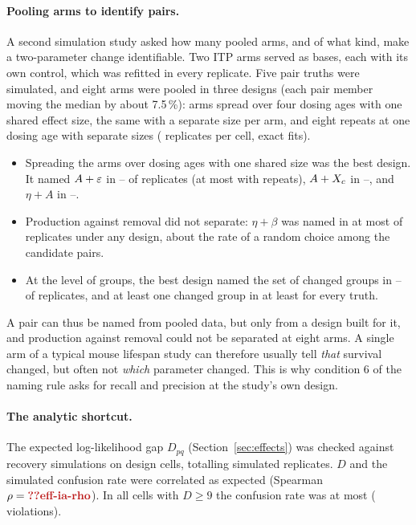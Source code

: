 \paragraph{Pooling arms to identify pairs.} A second simulation study asked how many pooled arms, and of what kind, make
a two-parameter change identifiable. Two ITP arms served as bases, each with its own control, which was refitted in
every replicate. Five pair truths were simulated, and eight arms were pooled
in three designs (each pair member moving the median by about 7.5\,\%): arms spread over four dosing ages with one shared effect size, the same with a separate size per arm,
and eight repeats at one dosing age with separate sizes ( replicates per cell, exact fits).
\begin{itemize}[leftmargin=1.5em,itemsep=1pt]
  \item Spreading the arms over dosing ages with one shared size was the best design. It named $A+\varepsilon$ in
    -- of replicates (at most  with repeats), $A+X_c$ in
    --, and $\eta+A$ in --.
  \item Production against removal did not separate: $\eta+\beta$ was named in at most  of
    replicates under any design, about the rate of a random choice among the candidate pairs.
  \item At the level of groups, the best design named the set of changed groups in --
    of replicates, and at least one changed group in at least  for every truth.
\end{itemize}
A pair can thus be named from pooled data, but only from a design built for it, and production against removal could
not be separated at eight arms.
A single arm of a typical mouse lifespan study can therefore usually tell \emph{that} survival changed, but often not
\emph{which} parameter changed. This is why condition 6 of the naming rule asks for recall and precision at the
study's own design.

\paragraph{The analytic shortcut.} The expected log-likelihood gap $D_{pq}$ (Section~\ref{sec:effects}) was checked
against recovery simulations on  design cells, totalling  simulated replicates.
$D$ and the simulated confusion rate were correlated as expected (Spearman $\rho=\C{eff-ia-rho}$). In all
 cells with $D\ge9$ the confusion rate was at most 
( violations).

